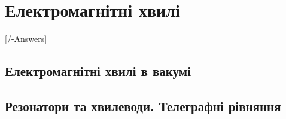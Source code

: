 
\chapter{Електромагнітні хвилі}\label{\currfilebase}
[\currfilebase/\currfilebase-Answers]
%

\section{Електромагнітні хвилі в вакумі}

\section{Резонатори та хвилеводи. Телеграфні рівняння}



